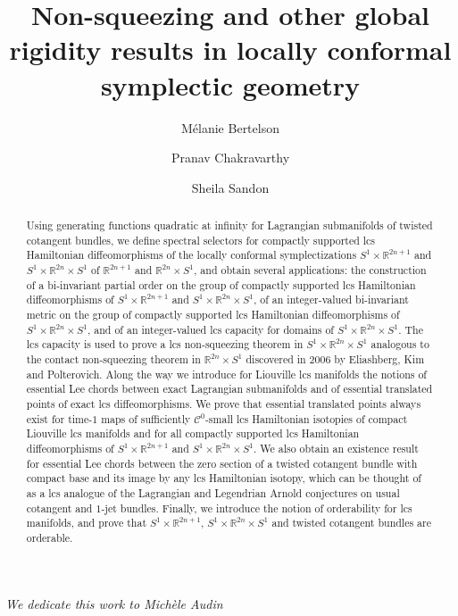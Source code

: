 \documentclass{amsart}
\title{Non-squeezing and other global rigidity results
in locally conformal symplectic geometry}
\author{M\'elanie Bertelson}
\author{Pranav Chakravarthy}
\author{Sheila Sandon}
\theoremstyle{remark}
\begin{document}
\maketitle
\begin{center}
\textit{We dedicate this work to Michèle Audin}
\end{center}
\begin{abstract}
\noindent Using generating functions quadratic at infinity
for Lagrangian submanifolds of twisted cotangent bundles,
we define spectral selectors
for compactly supported lcs Hamiltonian diffeomorphisms
of the locally conformal symplectizations
$S^1 \times \mathbb{R}^{2n+1}$ and $S^1 \times \mathbb{R}^{2n} \times S^1$
of $\mathbb{R}^{2n+1}$ and $\mathbb{R}^{2n} \times S^1$,
and obtain several applications:
the construction of a bi-invariant partial order
on the group of compactly supported lcs Hamiltonian diffeomorphisms
of $S^1 \times \mathbb{R}^{2n+1}$ and $S^1 \times \mathbb{R}^{2n} \times S^1$,
of an integer-valued bi-invariant metric
on the group of compactly supported lcs Hamiltonian diffeomorphisms
of $S^1 \times \mathbb{R}^{2n} \times S^1$,
and of an integer-valued lcs capacity
for domains of $S^1 \times \mathbb{R}^{2n} \times S^1$.
The lcs capacity is used to prove a lcs non-squeezing theorem
in $S^1 \times \mathbb{R}^{2n} \times S^1$
analogous to the contact non-squeezing theorem
in $\mathbb{R}^{2n} \times S^1$
discovered in 2006 by Eliashberg, Kim and Polterovich.
Along the way we introduce 
for Liouville lcs manifolds the notions
of essential Lee chords between exact Lagrangian submanifolds
and of essential translated points
of exact lcs diffeomorphisms.
We prove that essential translated points always exist
for time-$1$ maps of sufficiently $\mathcal{C}^0$-small lcs Hamiltonian isotopies
of compact Liouville lcs manifolds
and for all compactly supported lcs Hamiltonian diffeomorphisms
of $S^1 \times \mathbb{R}^{2n+1}$ and $S^1 \times \mathbb{R}^{2n} \times S^1$.
We also obtain an existence result for essential Lee chords
between the zero section of a twisted cotangent bundle with compact base
and its image by any lcs Hamiltonian isotopy,
which can be thought of as a lcs analogue
of the Lagrangian and Legendrian Arnold conjectures
on usual cotangent and $1$-jet bundles.
Finally,
we introduce the notion of orderability for lcs manifolds,
and prove that $S^1 \times \mathbb{R}^{2n+1}$, $S^1 \times \mathbb{R}^{2n} \times S^1$
and twisted cotangent bundles are orderable.

\end{abstract}
\end{document}
